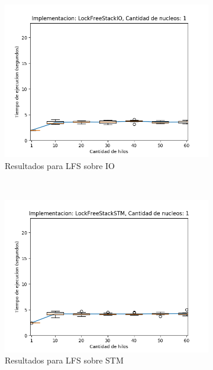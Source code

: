 \begin{appendices}
\begin{figure}[t]
    \begin{subfigure}[b]{0.49\textwidth}
        \includegraphics[width=\textwidth]{images/numberOfThreadsDist/plots/expLFSIO-1}
        \caption{Resultados para LFS sobre IO}
        \label{subfig:numberOfThreadsDist-lfsio-1}
    \end{subfigure}
    ~
    \begin{subfigure}[b]{0.49\textwidth}
        \includegraphics[width=\textwidth]{images/numberOfThreadsDist/plots/expLFSSTM-1}
        \caption{Resultados para LFS sobre STM}
        \label{subfig:numberOfThreadsDist-lfsstm-1}
    \end{subfigure}
    \begin{subfigure}[b]{0.49\textwidth}

\end{subfigure}
\end{figure}
\end{appendices}
